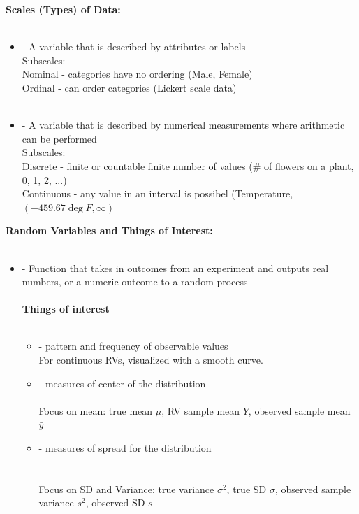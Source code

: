 \newpage

\large \noindent \textbf{Scales (Types) of Data:}\normalsize\\~\\

\begin{itemize}
\item {} - A variable that is described by attributes or labels\\
\indent Subscales: \\
Nominal - categories have no ordering (Male, Female)\\
Ordinal - can order categories (Lickert scale data)\\~\\
\item {} - A variable that is described by numerical measurements where arithmetic can be performed\\
\indent Subscales: \\
Discrete - finite or countable finite number of values (\# of flowers on a plant, 0, 1, 2, ...)\\
Continuous - any value in an interval is possibel (Temperature, $(-459.67\deg F, \infty)$
\end{itemize}

\large \noindent \textbf{Random Variables and Things of Interest:}\normalsize\\~\\
\begin{itemize}
\item {} - Function that takes in outcomes from an experiment and outputs real numbers, or a numeric outcome to a random process\\~\\
\textbf{Things of interest}\\~\\
\begin{itemize}
\item {} - pattern and frequency of observable values\\
For continuous RVs, visualized with a smooth curve.
\item {} - measures of center of the distribution\\~\\
Focus on mean: true mean $\mu$, RV sample mean $\bar{Y}$, observed sample mean $\bar{y}$
\item {} - measures of spread for the distribution\\~\\~\\
Focus on SD and Variance: true variance $\sigma^2$, true SD $\sigma$, observed sample variance $s^2$, observed SD $s$
\end{itemize}
\end{itemize}


